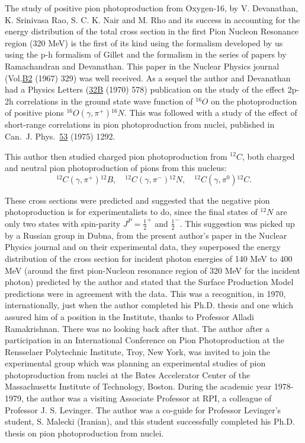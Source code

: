 The study of positive pion photoproduction from Oxygen-16, by V. Devanathan, K. Srinivasa Rao, S. C. K. Nair and M. Rho and its success in accounting for the energy distribution of the total cross section in the first Pion Nucleon Resonance region (320 MeV) is the first of its kind using the formalism developed by us using the p-h formalism of Gillet and the formalism in the series of papers by Ramachandran and Devanathan. This paper in the Nuclear Physics journal (Vol.\underline{B2} (1967) 329) was well received. As a sequel the author and Devanathan had a Physics Letters (\underline{32B} (1970) 578) publication on the study of the effect 2p-2h correlations in the ground state wave function of $^{16}O$ on the photoproduction of positive pions $^{16}O(\gamma, \pi^+){}^{16}N$. This was followed with a study of the effect of short-range correlations in pion photoproduction from nuclei, published in Can.\ J. Phys.\ \underline{53} (1975) 1292.

This author then studied charged pion photoproduction from $^{12}C$, both charged and neutral pion photoproduction of pions from this nucleus:
$$
{}^{12}C(\gamma, \pi^+){}^{12}B, \quad  {}^{12}C(\gamma, \pi^-){}^{12}N, \quad 
{}^{12}C(\gamma, \pi^0){}^{12}C.
$$

These cross sections were predicted and suggested that the negative pion photoproduction is for experimentalists to do, since the final states of ${}^{12}N$ are only two states with spin-parity $J^P=\frac{1}{2}^+$ and $\frac{1}{2}^-$. This suggestion was picked up by a Russian group in Dubna, from the present author's paper in the Nuclear Physics journal and on their experimental data, they superposed the energy distribution of the cross section for incident photon energies of 140 MeV to 400 MeV (around the first pion-Nucleon resonance region of 320 MeV for the incident photon) predicted by the author and stated that the Surface Production Model predictions were in agreement with the data. This was a recognition, in 1970, internationally, just when the author completed his Ph.D. thesis and one which assured him of a position in the Institute, thanks to Professor Alladi Ramakrishnan. There was no looking back after that. The author after a participation in an International Conference on Pion Photoproduction at the Rensselaer Polytechnic Institute, Troy, New York, was invited to join the experimental group which was planning an experimental studies of pion photoproduction from nuclei at the Bates Accelerator Center of the Massachusetts Institute of Technology, Boston. During the academic year 1978-1979, the author was a visiting Associate Professor at RPI, a colleague of Professor J. S. Levinger. The author was a co-guide for Professor Levinger's student, S. Malecki (Iranian), and this student successfully completed his Ph.D. thesis on pion photoproduction from nuclei.


